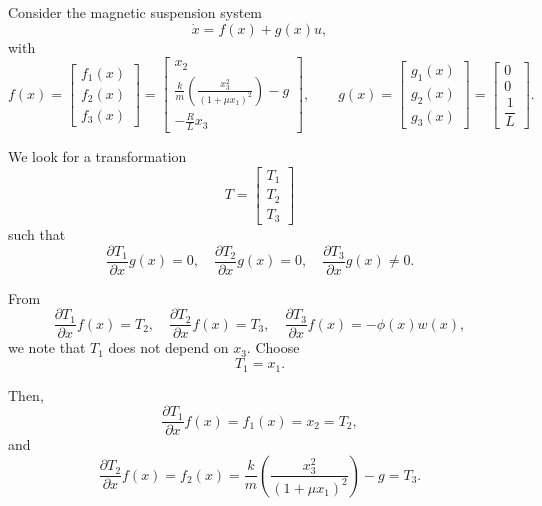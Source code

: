 \begin{example}
Consider the magnetic suspension system
\begin{equation}
\dot{x} = f(x) + g(x)u,
\end{equation}
with
\begin{equation}
f(x) =
\begin{bmatrix}
f_1(x) \\[3pt] f_2(x) \\[3pt] f_3(x)
\end{bmatrix}
=
\begin{bmatrix}
x_2 \\[5pt]
\frac{k}{m}\!\left(\!\frac{x_3^2}{(1+\mu x_1)^2}\!\right) - g \\[5pt]
-\frac{R}{L}x_3
\end{bmatrix},
\qquad
g(x) =
\begin{bmatrix}
g_1(x) \\[3pt] g_2(x) \\[3pt] g_3(x)
\end{bmatrix}
=
\begin{bmatrix}
0 \\[3pt] 0 \\[3pt] \dfrac{1}{L}
\end{bmatrix}.
\end{equation}

We look for a transformation
\begin{equation}
T =
\begin{bmatrix}
T_1 \\[3pt] T_2 \\[3pt] T_3
\end{bmatrix}
\end{equation}
such that
\begin{equation}
\frac{\partial T_1}{\partial x} g(x) = 0, \quad
\frac{\partial T_2}{\partial x} g(x) = 0, \quad
\frac{\partial T_3}{\partial x} g(x) \neq 0.
\end{equation}

From
\begin{equation}
\frac{\partial T_1}{\partial x} f(x) = T_2, \quad
\frac{\partial T_2}{\partial x} f(x) = T_3, \quad
\frac{\partial T_3}{\partial x} f(x) = -\phi(x)w(x),
\end{equation}
we note that \( T_1 \) does not depend on \( x_3 \).  
Choose
\begin{equation}
T_1 = x_1.
\end{equation}

Then,
\begin{equation}
\frac{\partial T_1}{\partial x} f(x) = f_1(x) = x_2 = T_2,
\end{equation}
and
\begin{equation}
\frac{\partial T_2}{\partial x} f(x) = f_2(x)
= \frac{k}{m}\!\left(\!\frac{x_3^2}{(1+\mu x_1)^2}\!\right) - g = T_3.
\end{equation}


\end{example}

